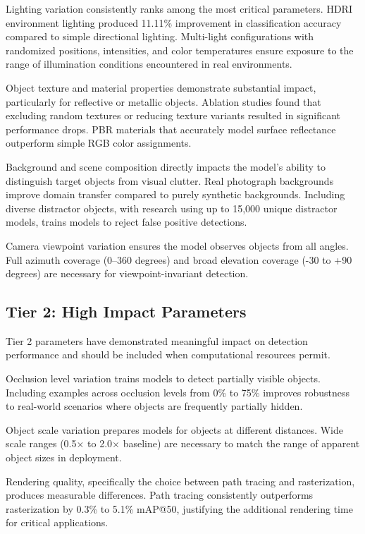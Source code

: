 Lighting variation consistently ranks among the most critical parameters. HDRI environment lighting produced 11.11\% improvement in classification accuracy compared to simple directional lighting. Multi-light configurations with randomized positions, intensities, and color temperatures ensure exposure to the range of illumination conditions encountered in real environments.

Object texture and material properties demonstrate substantial impact, particularly for reflective or metallic objects. Ablation studies found that excluding random textures or reducing texture variants resulted in significant performance drops. PBR materials that accurately model surface reflectance outperform simple RGB color assignments.

Background and scene composition directly impacts the model's ability to distinguish target objects from visual clutter. Real photograph backgrounds improve domain transfer compared to purely synthetic backgrounds. Including diverse distractor objects, with research using up to 15,000 unique distractor models, trains models to reject false positive detections.

Camera viewpoint variation ensures the model observes objects from all angles. Full azimuth coverage (0--360 degrees) and broad elevation coverage (-30 to +90 degrees) are necessary for viewpoint-invariant detection.

\subsection{Tier 2: High Impact Parameters}

Tier 2 parameters have demonstrated meaningful impact on detection performance and should be included when computational resources permit.

Occlusion level variation trains models to detect partially visible objects. Including examples across occlusion levels from 0\% to 75\% improves robustness to real-world scenarios where objects are frequently partially hidden.

Object scale variation prepares models for objects at different distances. Wide scale ranges (0.5$\times$ to 2.0$\times$ baseline) are necessary to match the range of apparent object sizes in deployment.

Rendering quality, specifically the choice between path tracing and rasterization, produces measurable differences. Path tracing consistently outperforms rasterization by 0.3\% to 5.1\% mAP@50, justifying the additional rendering time for critical applications.

